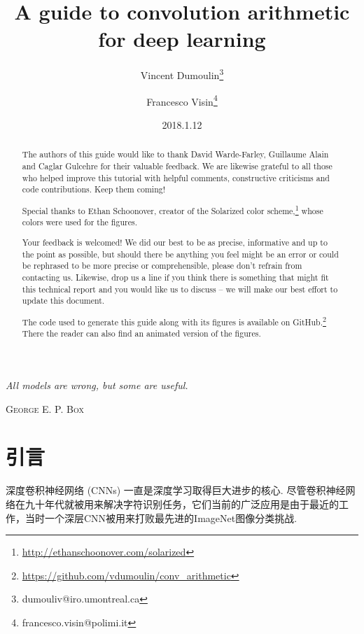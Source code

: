 \documentclass[notitlepage]{ctexrep}
\title{A guide to convolution arithmetic for deep learning}
\author[$\bigstar$]{Vincent Dumoulin\thanks{dumouliv@iro.umontreal.ca}}
\author[$\bigstar\dagger$]{Francesco Visin\thanks{francesco.visin@polimi.it}}
\affil[$\bigstar$]{MILA, Universit\'{e} de Montr\'{e}al}
\affil[$\dagger$]{AIRLab, Politecnico di Milano}
\date{2018.1.12}
\let\originalepigraph\epigraph
\renewcommand\epigraph[2]{\originalepigraph{\textit{#1}}{\textsc{#2}}}
\begin{document}
\maketitle
\thispagestyle{empty}
\clearpage

\setlength{\epigraphwidth}{0.4\textwidth}
\epigraph{All models are wrong, but some are useful.}{George E. P. Box}
\clearpage

\renewcommand{\abstractname}{Acknowledgements}
\begin{abstract}
    The authors of this guide would like to thank David Warde-Farley, Guillaume
    Alain and Caglar Gulcehre for their valuable feedback. We are likewise
    grateful to all those who helped improve this tutorial with helpful
    comments, constructive criticisms and code contributions. Keep them coming!

    Special thanks to Ethan Schoonover, creator of the Solarized color
    scheme,\footnote{\url{http://ethanschoonover.com/solarized}} whose colors
    were used for the figures.
\end{abstract}

\renewcommand{\abstractname}{Feedback}
\begin{abstract}
    Your feedback is welcomed! We did our best to be as precise, informative and
    up to the point as possible, but should there be anything you feel might be
    an error or could be rephrased to be more precise or comprehensible, please
    don't refrain from contacting us. Likewise, drop us a line if you think
    there is something that might fit this technical report and you would like
    us to discuss -- we will make our best effort to update this document.
\end{abstract}

\renewcommand{\abstractname}{Source code and animations}
\begin{abstract}
    The code used to generate this guide along with its figures is available on
    GitHub.\footnote{\url{https://github.com/vdumoulin/conv_arithmetic}} There
    the reader can also find an animated version of the figures.
\end{abstract}

\tableofcontents

\chapter{引言}

深度卷积神经网络 (CNNs) 一直是深度学习取得巨大进步的核心. 尽管卷积神经网络在九十年代就被用来解决字符识别任务\citep{le1997reading}，它们当前的广泛应用是由于最近的工作，当时一个深层CNN被用来打败最先进的ImageNet图像分类挑战\citep{krizhevsky2012imagenet}.
\end{document}
